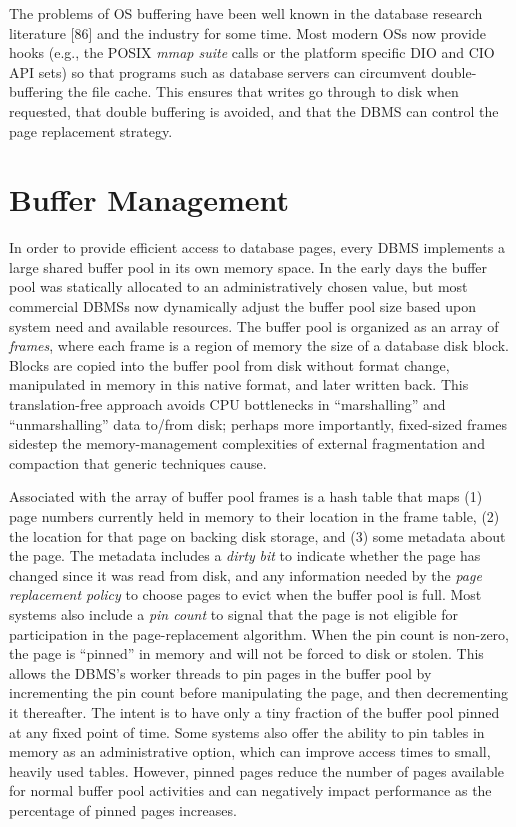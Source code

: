 \documentclass[b5paper,11pt,twoside,openright]{book}
\begin{document}
The problems of OS buffering have been well known in the database
research literature {[}86{]} and the industry for some time. Most modern
OSs now provide hooks (e.g., the POSIX \emph{mmap suite} calls or the
platform specific DIO and CIO API sets) so that programs such as
database servers can circumvent double-buffering the file cache. This
ensures that writes go through to disk when requested, that double
buffering is avoided, and that the DBMS can control the page replacement
strategy.

\hypertarget{buffer-management}{%
\section{Buffer Management}\label{buffer-management}}

In order to provide efficient access to database pages, every DBMS
implements a large shared buffer pool in its own memory space. In the
early days the buffer pool was statically allocated to an
administratively chosen value, but most commercial DBMSs now dynamically
adjust the buffer pool size based upon system need and available
resources. The buffer pool is organized as an array of \emph{frames},
where each frame is a region of memory the size of a database disk
block. Blocks are copied into the buffer pool from disk without format
change, manipulated in memory in this native format, and later written
back. This translation-free approach avoids CPU bottlenecks in
``marshalling'' and ``unmarshalling'' data to/from disk; perhaps more
importantly, fixed-sized frames sidestep the memory-management
complexities of external fragmentation and compaction that generic
techniques cause.

Associated with the array of buffer pool frames is a hash table that
maps (1) page numbers currently held in memory to their location in the
frame table, (2) the location for that page on backing disk storage, and
(3) some metadata about the page. The metadata includes a \emph{dirty}
\emph{bit} to indicate whether the page has changed since it was read
from disk, and any information needed by the \emph{page replacement
policy} to choose pages to evict when the buffer pool is full. Most
systems also include a \emph{pin count} to signal that the page is not
eligible for participation in the page-replacement algorithm. When the
pin count is non-zero, the page is ``pinned'' in memory and will not be
forced to disk or stolen. This allows the DBMS's worker threads to pin
pages in the buffer pool by incrementing the pin count before
manipulating the page, and then decrementing it thereafter. The intent
is to have only a tiny fraction of the buffer pool pinned at any fixed
point of time. Some systems also offer the ability to pin tables in
memory as an administrative option, which can improve access times to
small, heavily used tables. However, pinned pages reduce the number of
pages available for normal buffer pool activities and can negatively
impact performance as the percentage of pinned pages increases.
\end{document}
